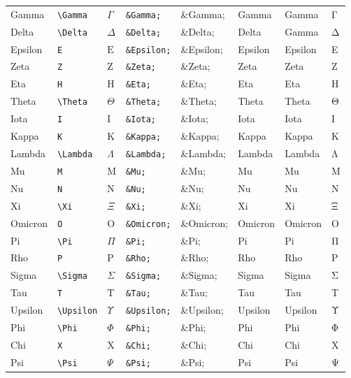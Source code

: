 \documentclass[11pt]{article}
\begin{document}
\begin{longtable}{llllllll}
Gamma & \texttt{\textbackslash{}Gamma} & $\Gamma$ & \texttt{\&Gamma;} & \&Gamma; & Gamma & Gamma & Γ\\
Delta & \texttt{\textbackslash{}Delta} & $\Delta$ & \texttt{\&Delta;} & \&Delta; & Delta & Gamma & Δ\\
Epsilon & \texttt{E} & $\mbox{E}$ & \texttt{\&Epsilon;} & \&Epsilon; & Epsilon & Epsilon & Ε\\
Zeta & \texttt{Z} & $\mbox{Z}$ & \texttt{\&Zeta;} & \&Zeta; & Zeta & Zeta & Ζ\\
Eta & \texttt{H} & $\mbox{H}$ & \texttt{\&Eta;} & \&Eta; & Eta & Eta & Η\\
Theta & \texttt{\textbackslash{}Theta} & $\Theta$ & \texttt{\&Theta;} & \&Theta; & Theta & Theta & Θ\\
Iota & \texttt{I} & $\mbox{I}$ & \texttt{\&Iota;} & \&Iota; & Iota & Iota & Ι\\
Kappa & \texttt{K} & $\mbox{K}$ & \texttt{\&Kappa;} & \&Kappa; & Kappa & Kappa & Κ\\
Lambda & \texttt{\textbackslash{}Lambda} & $\Lambda$ & \texttt{\&Lambda;} & \&Lambda; & Lambda & Lambda & Λ\\
Mu & \texttt{M} & $\mbox{M}$ & \texttt{\&Mu;} & \&Mu; & Mu & Mu & Μ\\
Nu & \texttt{N} & $\mbox{N}$ & \texttt{\&Nu;} & \&Nu; & Nu & Nu & Ν\\
Xi & \texttt{\textbackslash{}Xi} & $\Xi$ & \texttt{\&Xi;} & \&Xi; & Xi & Xi & Ξ\\
Omicron & \texttt{O} & $\mbox{O}$ & \texttt{\&Omicron;} & \&Omicron; & Omicron & Omicron & Ο\\
Pi & \texttt{\textbackslash{}Pi} & $\Pi$ & \texttt{\&Pi;} & \&Pi; & Pi & Pi & Π\\
Rho & \texttt{P} & $\mbox{P}$ & \texttt{\&Rho;} & \&Rho; & Rho & Rho & Ρ\\
Sigma & \texttt{\textbackslash{}Sigma} & $\Sigma$ & \texttt{\&Sigma;} & \&Sigma; & Sigma & Sigma & Σ\\
Tau & \texttt{T} & $\mbox{T}$ & \texttt{\&Tau;} & \&Tau; & Tau & Tau & Τ\\
Upsilon & \texttt{\textbackslash{}Upsilon} & $\Upsilon$ & \texttt{\&Upsilon;} & \&Upsilon; & Upsilon & Upsilon & Υ\\
Phi & \texttt{\textbackslash{}Phi} & $\Phi$ & \texttt{\&Phi;} & \&Phi; & Phi & Phi & Φ\\
Chi & \texttt{X} & $\mbox{X}$ & \texttt{\&Chi;} & \&Chi; & Chi & Chi & Χ\\
Psi & \texttt{\textbackslash{}Psi} & $\Psi$ & \texttt{\&Psi;} & \&Psi; & Psi & Psi & Ψ\\

\end{longtable}
\end{document}
